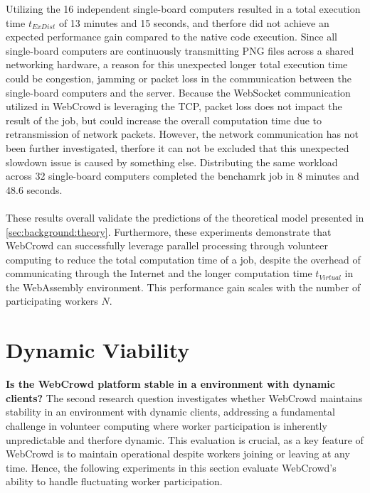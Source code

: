 Utilizing the 16 independent single-board computers resulted in a total execution time $t_{ExDist}$ of 13 minutes and 15 seconds, and therfore did not achieve an expected performance gain compared to the native code execution. Since all single-board computers are continuously transmitting \ac{PNG} files across a shared networking hardware, a reason for this unexpected longer total execution time could be congestion, jamming or packet loss in the communication between the single-board computers and the server. Because the WebSocket communication utilized in WebCrowd is leveraging the \ac{TCP}, packet loss does not impact the result of the job, but could increase the overall computation time due to retransmission of network packets. However, the network communication has not been further investigated, therfore it can not be excluded that this unexpected slowdown issue is caused by something else. Distributing the same workload across 32 single-board computers completed the benchamrk job in 8 minutes and 48.6 seconds.
\\~\\
These results overall validate the predictions of the theoretical model presented in \autoref{sec:background:theory}. Furthermore, these experiments demonstrate that WebCrowd can successfully leverage parallel processing through volunteer computing to reduce the total computation time of a job, despite the overhead of communicating through the Internet and the longer computation time $t_{Virtual}$ in the WebAssembly environment. This performance gain scales with the number of participating workers $N$.

\section{Dynamic Viability}
\label{sec:evaluation:dynamic}
\textbf{Is the WebCrowd platform stable in a environment with dynamic clients?}
\newline
The second research question investigates whether WebCrowd maintains stability in an environment with dynamic clients, addressing a fundamental challenge in volunteer computing where worker participation is inherently unpredictable and therfore dynamic. This evaluation is crucial, as a key feature of WebCrowd is to maintain operational despite workers joining or leaving at any time. Hence, the following experiments in this section evaluate WebCrowd's ability to handle fluctuating worker participation.

